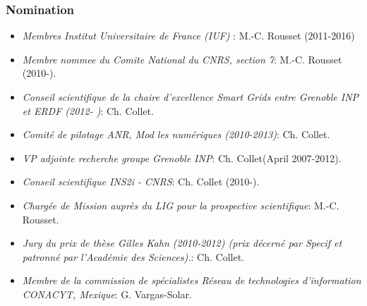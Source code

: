 \subsubsection*{Nomination}
\begin{itemize}

\setlength{\itemindent}{-0.5cm}
\setlength{\itemsep}{-0.1cm}

\item {\it Membres  Institut Universitaire de France (IUF) }: M.-C. Rousset (2011-2016)

\item {\it Membre nommee du Comite National du CNRS, section 7}: M.-C. Rousset (2010-).

\item {\it Conseil scientifique de la chaire d'excellence Smart Grids entre Grenoble INP et ERDF (2012- )}: Ch. Collet.

\item {\it Comit{\'e} de pilotage ANR, Mod les num{\'e}riques (2010-2013)}: Ch. Collet.

\item {\it VP adjointe recherche groupe Grenoble INP}: Ch. Collet(April 2007-2012).

\item {\it Conseil scientifique INS2i - CNRS}: Ch. Collet (2010-).

\item {\it Charg{\'e}e de Mission aupr{\`e}s du LIG pour la prospective scientifique}: M.-C. Rousset.

\item {\it Jury du prix de th{\`e}se Gilles Kahn (2010-2012) (prix d{\'e}cern{\'e} par Specif et patronn{\'e} par l'Acad{\'e}mie des Sciences).}: Ch. Collet.

\item {\it Membre de la commission de sp{\'e}cialistes R{\'e}seau de technologies d'information CONACYT, Mexique}: G. Vargas-Solar.




\end{itemize}



